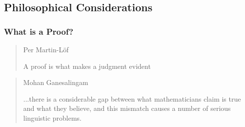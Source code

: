 \documentclass[10pt]{beamer}
\begin{document}
\subsection{Philosophical Considerations}

\begin{frame}

\frametitle{What is a Proof?}

\begin{quote}{Per Martin-Löf}

A proof is what makes a judgment evident %

\end{quote}


\end{frame}


\begin{frame}


\begin{quote}{Mohan Ganesalingam}

...there is a considerable gap between what mathematicians claim is true and what
they believe, and this mismatch causes a number of serious linguistic problems.

\end{quote}

\end{frame}
\end{document}
